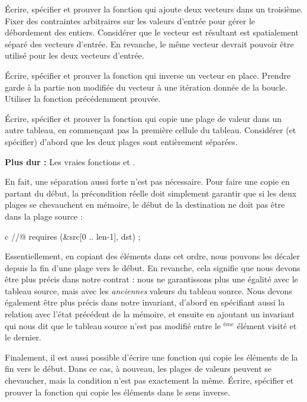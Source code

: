 Écrire, spécifier et prouver la fonction qui ajoute deux vecteurs dans un
troisième. Fixer des contraintes arbitraires sur les valeurs d'entrée pour
gérer le débordement des entiers. Considérer que le vecteur est résultant est
spatialement séparé des vecteurs d'entrée. En revanche, le même vecteur devrait
pouvoir être utilisé pour les deux vecteurs d'entrée.






Écrire, spécifier et prouver la fonction qui inverse un vecteur en place.
Prendre garde à la partie non modifiée du vecteur à une itération donnée de la
boucle. Utiliser la fonction  précédemment prouvée.






Écrire, spécifier et prouver la fonction  qui copie une plage
de valeur dans un autre tableau, en commençant pas la première cellule du
tableau. Considérer (et spécifier) d'abord que les deux plages sont entièrement
séparées.




\textbf{Plus dur :} Les vraies fonctions  et
.


En fait, une séparation aussi forte n'est pas nécessaire. Pour faire une copie
en partant du début, la précondition réelle doit simplement garantir que si les
deux plages se chevauchent en mémoire, le début de la destination ne doit pas être
dans la plage source :


\begin{CodeBlock}{c}
//@ requires \separated(&src[0 .. len-1], dst) ;
\end{CodeBlock}


Essentiellement, en copiant des éléments dans cet ordre, nous pouvons les
décaler depuis la fin d'une plage vers le début. En revanche, cela signifie que
nous devons être plus précis dans notre contrat : nous ne garantissons plus une
égalité avec le tableau source, mais avec les \emph{anciennes} valeurs du tableau
source. Nous devons également être plus précis dans notre invariant, d'abord en
spécifiant aussi la relation avec l'état précédent de la mémoire, et ensuite en
ajoutant un invariant qui nous dit que le tableau source n'est pas modifié entre
le $^{ème}$ élément visité et le dernier.


Finalement, il est aussi possible d'écrire une fonction qui copie les éléments de
la fin vers le début. Dans ce cas, à nouveau, les plages de valeurs peuvent se
chevaucher, mais la condition n'est pas exactement la même. Écrire, spécifier et
prouver la fonction  qui copie les éléments dans le
sens inverse.
